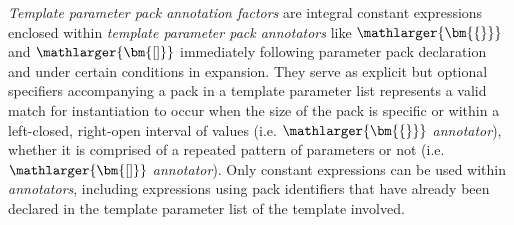
\p \textit{Template parameter pack annotation factors} are integral constant expressions enclosed within \textit{template parameter pack annotators} like $\mathlarger{\bm{\{\}}}$ and $\mathlarger{\bm{[]}}$ immediately following parameter pack declaration and under certain conditions in expansion.
They serve as explicit but optional specifiers accompanying a pack in a template parameter list represents a valid match for instantiation to occur when the size of the pack is specific or within a left-closed, right-open interval of values (i.e. $\mathlarger{\bm{\{\}}}$ \textit{annotator}), whether it is comprised of a repeated pattern of parameters or not (i.e. $\mathlarger{\bm{[]}}$ \textit{annotator}).
Only constant expressions can be used within \textit{annotators}, including expressions using pack identifiers that have already been declared in the template parameter list of the template involved.

